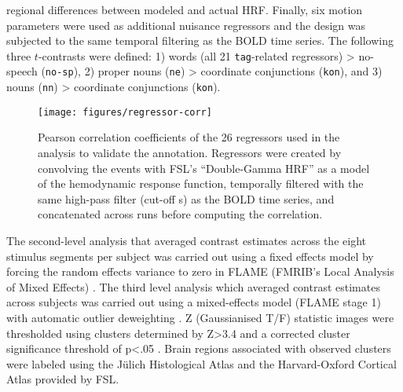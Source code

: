 \documentclass[10pt,a4paper,onecolumn]{article}
\begin{document}
regional differences between modeled and actual HRF.
Finally, six motion parameters were used as additional nuisance regressors and
the design was subjected to the same temporal filtering as the BOLD time series.
The following three $t$-contrasts were defined: 1) words (all 21
\texttt{tag}-related regressors) > no-speech (\texttt{no-sp}),
2) proper nouns (\texttt{ne}) > coordinate conjunctions (\texttt{kon}), and
3) nouns (\texttt{nn}) > coordinate conjunctions (\texttt{kon}).

\begin{figure*} \centering
    \texttt{[image: figures/regressor-corr]} \caption{Pearson
        correlation coefficients of the 26 regressors used in the analysis to
        validate the annotation. Regressors were created by convolving the
        events with FSL's ``Double-Gamma HRF'' as a model of the hemodynamic
        response function, temporally filtered with the same high-pass filter
        (cut-off \unit[150]{s}) as the BOLD time series, and concatenated across
    runs before computing the correlation.}
    \label{fig:reg-corr}
\end{figure*}


The second-level analysis that averaged contrast estimates across the eight
stimulus segments per subject was carried out using a fixed effects model by
forcing the random effects variance to zero in FLAME (FMRIB's Local Analysis of
Mixed Effects) \citep{beckmann2003general, woolrich2004multilevel}.
The third level analysis which averaged contrast estimates across subjects was
carried out using a mixed-effects model (FLAME stage 1) with automatic outlier deweighting
\citep{woolrich2004multilevel, woolrich2008robust}.
Z (Gaussianised T/F) statistic images were thresholded using clusters determined
by Z>3.4 and a corrected cluster significance threshold of p<.05
\citep{woolrich2008robust}.
Brain regions associated with observed clusters were labeled using the Jülich
Histological Atlas \citep{eickhoff2005toolbox,eickhoff2007assignment} and the
Harvard-Oxford Cortical Atlas \citep{desikan2006automated} provided by FSL.
\end{document}
